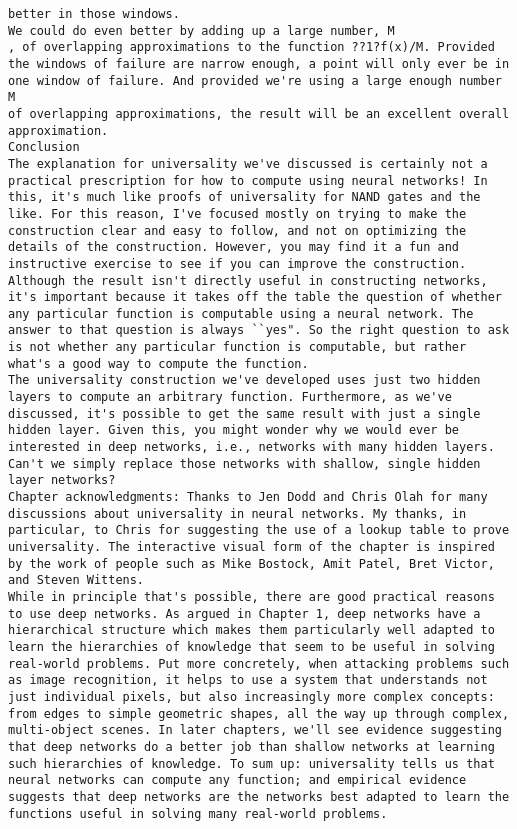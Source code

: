 \begin{lstlisting}
better in those windows.
We could do even better by adding up a large number, M
, of overlapping approximations to the function ??1?f(x)/M. Provided the windows of failure are narrow enough, a point will only ever be in one window of failure. And provided we're using a large enough number M
of overlapping approximations, the result will be an excellent overall approximation.
Conclusion
The explanation for universality we've discussed is certainly not a practical prescription for how to compute using neural networks! In this, it's much like proofs of universality for NAND gates and the like. For this reason, I've focused mostly on trying to make the construction clear and easy to follow, and not on optimizing the details of the construction. However, you may find it a fun and instructive exercise to see if you can improve the construction.
Although the result isn't directly useful in constructing networks, it's important because it takes off the table the question of whether any particular function is computable using a neural network. The answer to that question is always ``yes". So the right question to ask is not whether any particular function is computable, but rather what's a good way to compute the function.
The universality construction we've developed uses just two hidden layers to compute an arbitrary function. Furthermore, as we've discussed, it's possible to get the same result with just a single hidden layer. Given this, you might wonder why we would ever be interested in deep networks, i.e., networks with many hidden layers. Can't we simply replace those networks with shallow, single hidden layer networks?
Chapter acknowledgments: Thanks to Jen Dodd and Chris Olah for many discussions about universality in neural networks. My thanks, in particular, to Chris for suggesting the use of a lookup table to prove universality. The interactive visual form of the chapter is inspired by the work of people such as Mike Bostock, Amit Patel, Bret Victor, and Steven Wittens. 
While in principle that's possible, there are good practical reasons to use deep networks. As argued in Chapter 1, deep networks have a hierarchical structure which makes them particularly well adapted to learn the hierarchies of knowledge that seem to be useful in solving real-world problems. Put more concretely, when attacking problems such as image recognition, it helps to use a system that understands not just individual pixels, but also increasingly more complex concepts: from edges to simple geometric shapes, all the way up through complex, multi-object scenes. In later chapters, we'll see evidence suggesting that deep networks do a better job than shallow networks at learning such hierarchies of knowledge. To sum up: universality tells us that neural networks can compute any function; and empirical evidence suggests that deep networks are the networks best adapted to learn the functions useful in solving many real-world problems.

\end{lstlisting}
